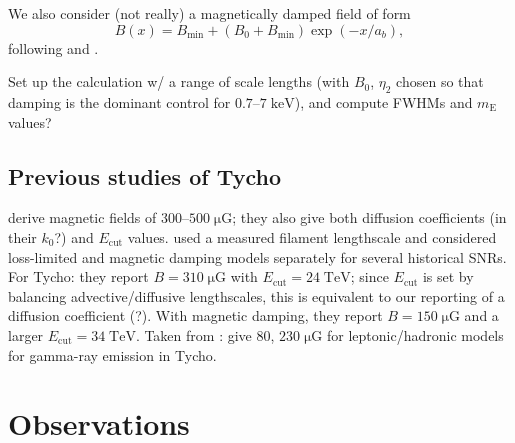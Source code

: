 \documentclass[iop, apj, numberedappendix, twocolappendix]{emulateapj}
\newcommand*{\mt}{\mathrm}
\newcommand*{\unit}[1]{\;\mt{#1}}  %
\newcommand*{\mE}{m_\mt{E}}
\newcommand*{\Ecut}{E_{\mt{cut}}}
\begin{document}
We also consider (not really) a magnetically damped field of form
\begin{equation}
    B(x) = B_{\mt{min}} + \left(B_0 + B_{\mt{min}}\right) \exp\left(-x / a_b\right) ,
\end{equation}
following  and \citet{pohl2005}.

Set up the calculation w/ a range of scale lengths (with $B_0$,
$\eta_2$ chosen so that damping is the dominant control for $0.7$--$7
\unit{keV}$), and compute FWHMs and $\mE$ values?


\subsection{Previous studies of Tycho}

\citet{parizot2006} derive magnetic fields of $300$--$500 \unit{\mu G}$; they
also give both diffusion coefficients (in their $k_0$?) and $\Ecut$ values.
\citet{rettig2012} used a measured filament lengthscale and considered
loss-limited and magnetic damping models separately for several historical
SNRs.  For Tycho: they report $B = 310 \unit{\mu G}$ with $\Ecut = 24
\unit{TeV}$; since $\Ecut$ is set by balancing advective/diffusive
lengthscales, this is equivalent to our reporting of a diffusion coefficient
(?).  With magnetic damping, they report $B = 150 \unit{\mu G}$ and a larger
$\Ecut = 34 \unit{TeV}$.  Taken from \citet{rettig2012}: \citet{acciari2011}
give $80$, $230 \unit{\mu G}$ for leptonic/hadronic models for gamma-ray
emission in Tycho.


\section{Observations}
\label{sec:observations}
\end{document}
